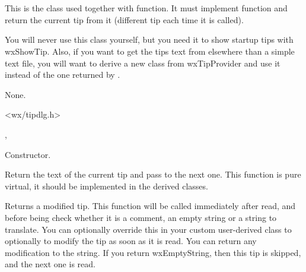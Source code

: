\section{}\label{wxtipprovider}

This is the class used together with  function.
It must implement  function and return the
current tip from it (different tip each time it is called).

You will never use this class yourself, but you need it to show startup tips
with wxShowTip. Also, if you want to get the tips text from elsewhere than a
simple text file, you will want to derive a new class from wxTipProvider and
use it instead of the one returned by .


None.


<wx/tipdlg.h>


, 


\label{wxtipproviderctor}


Constructor.


\label{wxtipprovidergettip}


Return the text of the current tip and pass to the next one. This function is
pure virtual, it should be implemented in the derived classes.

\label{wxtipproviderpreprocesstip}


Returns a modified tip. This function will be called immediately after read,
and before being check whether it is a comment, an empty string or a string 
to translate. You can optionally override this in your custom user-derived class 
to optionally to modify the tip as soon as it is read. You can return any 
modification to the string. If you return wxEmptyString, then this tip is 
skipped, and the next one is read.

